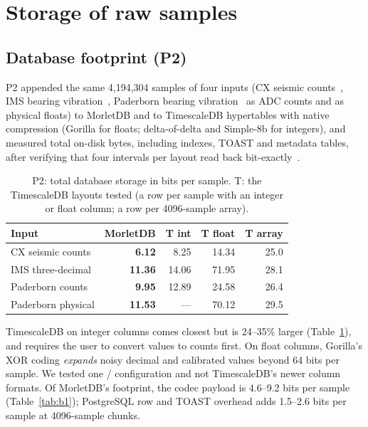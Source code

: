\documentclass[sigconf,nonacm]{acmart}
\newcommand{\M}{MorletDB}
\begin{document}
\section{Storage of raw samples}\label{sec:storage}
\subsection{Database footprint (P2)}
P2 appended the same 4,194,304 samples of four inputs (CX seismic counts~\cite{ipoc}, IMS bearing vibration~\cite{ims}, Paderborn bearing vibration~\cite{paderborn} as ADC counts and as physical floats) to \M{} and to TimescaleDB hypertables with native compression (Gorilla for floats; delta-of-delta and Simple-8b for integers), and measured total on-disk bytes, including indexes, TOAST and metadata tables, after verifying that four intervals per layout read back bit-exactly~\cite{plain}.

\begin{table}[t]
\caption{P2: total database storage in bits per sample. T: the TimescaleDB layouts tested (a row per sample with an integer or float column; a row per 4096-sample array).}
\label{tab:p2}
\small
\begin{tabular}{@{}lrrrr@{}}
\toprule
Input & \M{} & T int & T float & T array \\
\midrule
CX seismic counts & \textbf{6.12} & 8.25 & 14.34 & 25.0 \\
IMS three-decimal & \textbf{11.36} & 14.06 & 71.95 & 28.1 \\
Paderborn counts & \textbf{9.95} & 12.89 & 24.58 & 26.4 \\
Paderborn physical & \textbf{11.53} & --- & 70.12 & 29.5 \\
\bottomrule
\end{tabular}
\end{table}

TimescaleDB on integer columns comes closest but is 24--35\% larger (Table~\ref{tab:p2}), and requires the user to convert values to counts first. On float columns, Gorilla's XOR coding \emph{expands} noisy decimal and calibrated values beyond 64 bits per sample. We tested one / configuration and not TimescaleDB's newer column formats. Of \M{}'s footprint, the codec payload is 4.6--9.2 bits per sample (Table~\ref{tab:b1}); PostgreSQL row and TOAST overhead adds 1.5--2.6 bits per sample at 4096-sample chunks.
\end{document}

